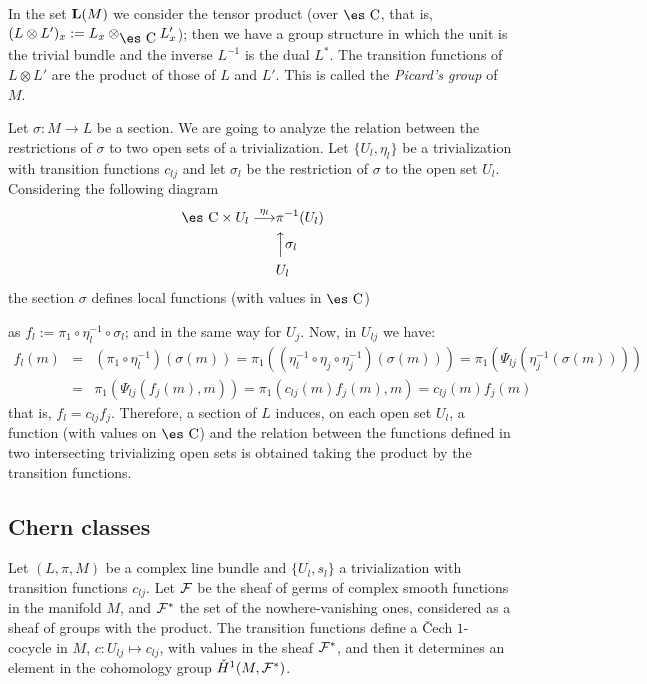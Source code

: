 \documentclass[12pt]{article}
\def\beann{\begin{eqnarray*}}
\def\eeann{\end{eqnarray*}}
\def\mapping#1{\mathrel{\mathop{\longrightarrow}\limits^{#1}}}
\def\Complex{\mbox{\es C}}
\begin{document}
In the set ${\bf L}(M)$
we consider the tensor product  (over $\Complex$, that is,
$(L \otimes L')_x := L_x \otimes_{\Complex}L'_x$);
then we have a group structure in which
the unit is the trivial bundle and the inverse $L^{-1}$ is the dual
$L^*$.
The transition functions of $L \otimes L'$ are the product of those of
$L$ and $L'$.
This is called the {\it Picard's group} of $M$.

Let $\sigma : M \to L$ be a section. We are going to analyze the
relation
between the restrictions of $\sigma$ to two open sets of a
trivialization.
Let $\{ U_l,\eta_l \}$ be a trivialization with transition functions
$c_{l j}$ and let $\sigma_l$ be the restriction of $\sigma$ to the open
set $U_l$.
Considering the following diagram
\beann
\Complex \times U_l \mapping{\eta_l} &\pi^{-1}(U_l)&
\\
& \Big\uparrow  \sigma_l &
\\
& U_l &
\eeann
the section $\sigma$ defines local functions (with values in $\Complex$)

as
$f_l := \pi_1 \circ \eta_l^{-1} \circ \sigma_l$;
and in the same way for $U_j$. Now, in $U_{l j}$ we have:
\beann
f_l(m)
&=&
(\pi_1 \circ \eta_l^{-1})(\sigma (m)) =
\pi_1((\eta_l^{-1} \circ \eta_j \circ \eta_j^{-1})(\sigma (m)))=
\pi_1(\Psi_{l j}(\eta_j^{-1}(\sigma (m))))
\\ &=&
\pi_1(\Psi_{l j}(f_j(m),m))=
\pi_1(c_{l j}(m)f_j(m),m) =
c_{l j}(m)f_j(m)
\eeann
that is, $f_l = c_{l j}f_j$.
Therefore, a section of $L$ induces, on each open set $U_l$,
a function (with values on $\Complex$) and the relation between the
functions defined
in two intersecting trivializing open sets
is obtained taking the product by the transition functions.



\subsection{Chern classes}


Let $(L,\pi ,M)$ be a complex line bundle and $\{ U_l,s_l \}$ a
trivialization
with transition functions $c_{l j}$. Let ${\cal F}$ be
the sheaf of germs of complex smooth functions
in the manifold $M$, and ${\cal F}^*$ the set of the nowhere-vanishing
ones,
considered as a sheaf of groups with the product.
The transition functions define a \v{C}ech $1$-cocycle in $M$,
$c:U_{l j} \mapsto c_{l j}$, with values in the sheaf ${\cal F}^*$,
and then it determines an element in the cohomology group
$\check{H}^1(M,{\cal F}^*)$.
\end{document}
